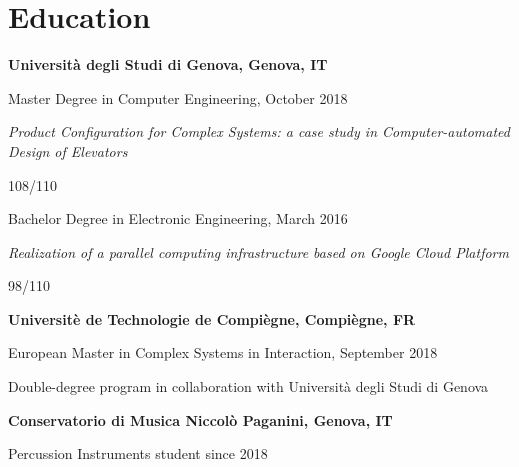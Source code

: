 \section{\sc Education}
{\bf Universit\`a degli Studi di Genova, Genova, IT}
\begin{list1}
\item[] Master Degree in Computer Engineering, October 2018
\item[] \textit{Product Configuration for Complex Systems: a case study
	in Computer-automated Design of Elevators}
\item[] 108/110
\end{list1}
\begin{list1}
	\item[] Bachelor Degree in Electronic Engineering, March 2016
	\item[] \textit{Realization of a parallel computing infrastructure 
		based on Google Cloud Platform}
	\item[] 98/110
\end{list1}

{\bf Universit\`e de Technologie de Compi\`egne, Compi\`egne, FR}
\begin{list1}
	\item[] European Master in Complex Systems in Interaction, September 2018
	\item[] Double-degree program in collaboration with Universit\`a 
	degli Studi di Genova
\end{list1}

{\bf Conservatorio di Musica Niccol\`o Paganini, Genova, IT}
\begin{list1}
	\item[] Percussion Instruments student since 2018
\end{list1}